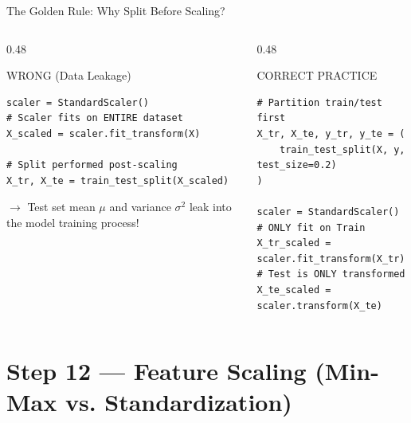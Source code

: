 \documentclass[aspectratio=169,11pt]{beamer}
\begin{document}
\begin{frame}[fragile]{The Golden Rule: Why Split Before Scaling?}
\begin{columns}[T]
\begin{column}{0.48\textwidth}
\begin{alertblock}{WRONG (Data Leakage)}
\begin{lstlisting}[style=pythonstyle]
scaler = StandardScaler()
# Scaler fits on ENTIRE dataset
X_scaled = scaler.fit_transform(X)

# Split performed post-scaling
X_tr, X_te = train_test_split(X_scaled)
\end{lstlisting}
$\rightarrow$ Test set mean $\mu$ and variance $\sigma^2$ leak into the model training process!
\end{alertblock}
\end{column}
\begin{column}{0.48\textwidth}
\begin{block}{CORRECT PRACTICE}
\begin{lstlisting}[style=pythonstyle]
# Partition train/test first
X_tr, X_te, y_tr, y_te = (
    train_test_split(X, y, test_size=0.2)
)

scaler = StandardScaler()
# ONLY fit on Train
X_tr_scaled = scaler.fit_transform(X_tr)
# Test is ONLY transformed
X_te_scaled = scaler.transform(X_te)
\end{lstlisting}
\end{block}
\end{column}
\end{columns}
\end{frame}

\section{Step 12 — Feature Scaling (Min-Max vs. Standardization)}
\end{document}
